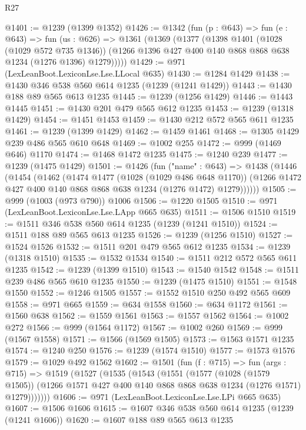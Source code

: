 \begin{lexlean}{R27}
\begin{coremodule}
@1401 := @1239 (@1399 @1352)
@1426 := @1342
    (fun (p : @643) =>
    fun (e : @643) =>
    fun (us : @626) =>
    @1361
      (@1369
        (@1377
          (@1398
            @1401
            (@1028 (@1029 @572 @735 @1346))
            (@1266 @1396 @427 @400 @140 @868 @868 @638 @1234 (@1276 @1396) @1279)))))
@1429 := @971 (LexLeanBoot.LexiconLse.Lse.LLocal @635)
@1430 := @1284 @1429
@1438 := @1430 @346 @538 @560 @614 @1235 (@1239 (@1241 @1429))
@1443 := @1430 @188 @89 @565 @613 @1235
@1445 := @1239 (@1256 @1429)
@1446 := @1443 @1445
@1451 := @1430 @201 @479 @565 @612 @1235
@1453 := @1239 (@1318 @1429)
@1454 := @1451 @1453
@1459 := @1430 @212 @572 @565 @611 @1235
@1461 := @1239 (@1399 @1429)
@1462 := @1459 @1461
@1468 := @1305 @1429 @239 @486 @565 @610 @648
@1469 := @1002 @255
@1472 := @999 (@1469 @646) @1170
@1474 := @1468 @1472 @1235
@1475 := @1240 @239
@1477 := @1239 (@1475 @1429)
@1501 := @1426
    (fun ("name" : @643) =>
    @1438
      (@1446
        (@1454
          (@1462
            (@1474
              @1477
              (@1028 (@1029 @486 @648 @1170))
              (@1266 @1472 @427 @400 @140 @868 @868 @638 @1234 (@1276 @1472) @1279))))))
@1505 := @999 (@1003 (@973 @790)) @1006
@1506 := @1220 @1505
@1510 := @971 (LexLeanBoot.LexiconLse.Lse.LApp @665 @635)
@1511 := @1506 @1510
@1519 := @1511 @346 @538 @560 @614 @1235 (@1239 (@1241 @1510))
@1524 := @1511 @188 @89 @565 @613 @1235
@1526 := @1239 (@1256 @1510)
@1527 := @1524 @1526
@1532 := @1511 @201 @479 @565 @612 @1235
@1534 := @1239 (@1318 @1510)
@1535 := @1532 @1534
@1540 := @1511 @212 @572 @565 @611 @1235
@1542 := @1239 (@1399 @1510)
@1543 := @1540 @1542
@1548 := @1511 @239 @486 @565 @610 @1235
@1550 := @1239 (@1475 @1510)
@1551 := @1548 @1550
@1552 := @1246 @1505
@1557 := @1552 @1510 @250 @492 @565 @609
@1558 := @971 @665
@1559 := @634 @1558
@1560 := @634 @1172
@1561 := @1560 @638
@1562 := @1559 @1561
@1563 := @1557 @1562
@1564 := @1002 @272
@1566 := @999 (@1564 @1172)
@1567 := @1002 @260
@1569 := @999 (@1567 @1558)
@1571 := @1566 (@1569 @1505)
@1573 := @1563 @1571 @1235
@1574 := @1240 @250
@1576 := @1239 (@1574 @1510)
@1577 := @1573 @1576
@1579 := @1029 @492 @1562
@1602 := @1501
    (fun (f : @715) =>
    fun (args : @715) =>
    @1519
      (@1527
        (@1535
          (@1543
            (@1551
              (@1577
                (@1028 (@1579 @1505))
                (@1266 @1571 @427 @400 @140 @868 @868 @638 @1234 (@1276 @1571) @1279)))))))
@1606 := @971 (LexLeanBoot.LexiconLse.Lse.LPi @665 @635)
@1607 := @1506 @1606
@1615 := @1607 @346 @538 @560 @614 @1235 (@1239 (@1241 @1606))
@1620 := @1607 @188 @89 @565 @613 @1235

\end{coremodule}
\end{lexlean}
